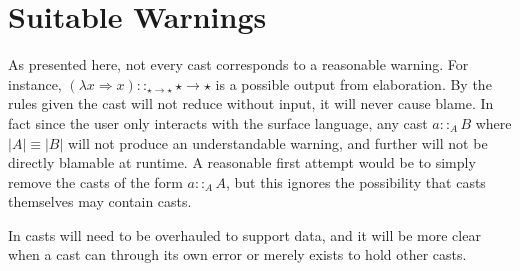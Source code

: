 \section{Suitable Warnings}
 
As presented here, not every cast corresponds to a reasonable warning.
For instance, $\left(\lambda x\Rightarrow x\right)::_{\star\rightarrow\star}\star\rightarrow\star$ is a possible output from elaboration.
By the rules given the cast will not reduce without input, it will never cause blame.
In fact since the user only interacts with the surface language, any cast $a::_{A}B$ where $|A|\equiv|B|$ will not produce an understandable warning, and further will not be directly blamable at runtime.
A reasonable first attempt would be to simply remove the casts of the form $a::_{A}A$, but this ignores the possibility that casts themselves may contain casts.
 
 
 
In  casts will need to be overhauled to support data, and it will be more clear when a cast can through its own error or merely exists to hold other casts.
